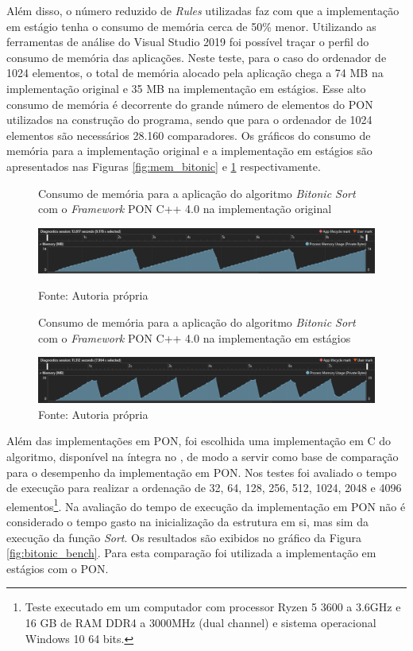 Além disso, o número reduzido de \textit{Rules} utilizadas faz com que a
implementação em estágio tenha o consumo de memória cerca de 50\% menor.
Utilizando as ferramentas de análise do Visual Studio 2019 foi possível traçar o
perfil do consumo de memória das aplicações. Neste teste, para o caso do
ordenador de 1024 elementos, o total de memória alocado pela aplicação chega a
74 MB na implementação original e 35 MB na implementação em estágios. Esse alto
consumo de memória é decorrente do grande número de elementos do PON utilizados
na construção do programa, sendo que para o ordenador de 1024 elementos são
necessários 28.160 comparadores. Os gráficos do consumo de memória para a
implementação original e a implementação em estágios são apresentados nas
Figuras \ref{fig:mem_bitonic} e \ref{fig:mem_bitonic_nop_old} respectivamente.

\begin{figure}[!htb]
\centering
\caption{Consumo de memória para a aplicação do algoritmo \textit{Bitonic Sort}
com o \textit{Framework} PON C++ 4.0 na implementação original}
\smallskip
\includegraphics[width=\textwidth]{../figures/mem_bitonic.png}
\caption*{Fonte: Autoria própria}
\label{fig:mem_bitonic}
\smallskip
\caption{Consumo de memória para a aplicação do algoritmo \textit{Bitonic Sort}
com o \textit{Framework} PON C++ 4.0 na implementação em estágios}
\smallskip
\includegraphics[width=\textwidth]{../figures/mem_bitonic_nop_old.png}
\caption*{Fonte: Autoria própria}
\label{fig:mem_bitonic_nop_old}
\end{figure}

Além das implementações em PON, foi escolhida uma implementação em C do
algoritmo, disponível na íntegra no \cite{pitsianis_2008}, de modo a
servir como base de comparação para o desempenho da implementação em PON. Nos
testes foi avaliado o tempo de execução para realizar a ordenação de 32, 64,
128, 256, 512, 1024, 2048 e 4096 elementos\footnote{Teste executado em um
computador com processor Ryzen 5 3600 a 3.6GHz e 16 GB de RAM DDR4 a 3000MHz
(dual channel) e sistema operacional Windows 10 64 bits.}. Na avaliação do tempo
de execução da implementação em PON não é considerado o tempo gasto na
inicialização da estrutura em si, mas sim da execução da função \textit{Sort}.
Os resultados são exibidos no gráfico da Figura \ref{fig:bitonic_bench}. Para
esta comparação foi utilizada a implementação em estágios com o PON.

